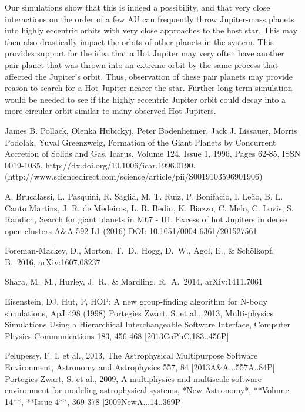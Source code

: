 \documentclass[12pt]{article}
\begin{document}
Our simulations show that this is indeed a possibility, and that very close
interactions on the order of a few AU can frequently throw Jupiter-mass planets into
highly eccentric orbits with very close approaches to the host star. 
This may then also drastically impact the orbits of other planets
in the system. This provides support for the idea that a Hot Jupiter may very
often have another pair planet that was thrown into an extreme orbit by the same
process that affected the Jupiter's orbit. Thus,
observation of these pair planets may provide reason to search for a Hot Jupiter
nearer the star.
Further long-term simulation would be needed to see if the highly eccentric Jupiter
orbit could decay into a more circular orbit similar to many observed Hot Jupiters.


\clearpage

\begin{thebibliography}{9}

James B. Pollack, Olenka Hubickyj, Peter Bodenheimer, Jack J. Lissauer, Morris Podolak, Yuval Greenzweig, Formation of the Giant Planets by Concurrent Accretion of Solids and Gas, Icarus, Volume 124, Issue 1, 1996, Pages 62-85, ISSN 0019-1035, http://dx.doi.org/10.1006/icar.1996.0190.
(http://www.sciencedirect.com/science/article/pii/S0019103596901906)

A.  Brucalassi, L.  Pasquini, R.  Saglia, M. T.  Ruiz, P.  Bonifacio, I.  Leão, B. L.  Canto Martins, J. R.  de Medeiros, L. R.  Bedin, K.  Biazzo, C.  Melo, C.  Lovis, S.  Randich,
Search for giant planets in M67 - III. Excess of hot Jupiters in dense open clusters
A\&A 592 L1 (2016)
DOI: 10.1051/0004-6361/201527561

Foreman-Mackey, D., Morton, T.~D., Hogg, D.~W., Agol, E., \& Sch{\"o}lkopf, B.\ 2016, arXiv:1607.08237 

 Shara, M.~M., Hurley, J.~R., \& Mardling, R.~A.\ 2014, arXiv:1411.7061 

 Eisenstein, DJ, Hut, P, HOP: A new group-finding algorithm for N-body simulations, ApJ 498 (1998)
 Portegies Zwart, S. et al., 2013, Multi-physics Simulations Using a Hierarchical Interchangeable Software Interface, Computer Physics Communications 183, 456-468 [2013CoPhC.183..456P]
		
 Pelupessy, F. I. et al., 2013, The Astrophysical Multipurpose Software Environment, Astronomy and Astrophysics 557, 84 [2013A\&A...557A..84P]
 Portegies Zwart, S. et al., 2009, A multiphysics and multiscale software environment for modeling astrophysical systems, *New Astronomy*, **Volume 14**, **Issue 4**, 369-378 [2009NewA...14..369P]

\end{thebibliography}
\end{document}

